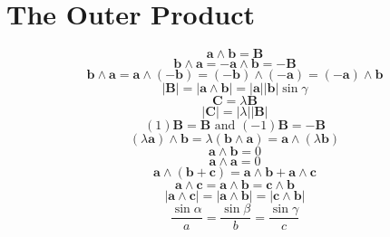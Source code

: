 \documentclass[11pt, a4paper, fleqn]{report}
\numberwithin{equation}{section}
\begin{document}
\section{The Outer Product}
\begin{equation}
    \mathbf{a}\wedge\mathbf{b}=\mathbf{B}
\end{equation}
\begin{equation}
    \mathbf{b}\wedge\mathbf{a}=-\mathbf{a}\wedge\mathbf{b}=-\mathbf{B}
\end{equation}
\begin{equation}
    \mathbf{b}\wedge\mathbf{a}=\mathbf{a}\wedge(-\mathbf{b})=(-\mathbf{b})\wedge(-\mathbf{a})=(-\mathbf{a})\wedge\mathbf{b}
\end{equation}
\begin{equation}
    |\mathbf{B}|=|\mathbf{a}\wedge\mathbf{b}|=|\mathbf{a}||\mathbf{b}|\sin\gamma
\end{equation}
\begin{equation}
    \mathbf{C}=\lambda\mathbf{B}
\end{equation}
\begin{equation}
    |\mathbf{C}|=|\lambda||\mathbf{B}|
\end{equation}
\begin{equation}
    (1)\mathbf{B}=\mathbf{B}\textrm{ and }(-1)\mathbf{B}=-\mathbf{B}
\end{equation}
\begin{equation}
    (\lambda\mathbf{a})\wedge\mathbf{b}=\lambda(\mathbf{b}\wedge\mathbf{a})=\mathbf{a}\wedge(\lambda\mathbf{b})
\end{equation}
\begin{equation}
    \mathbf{a}\wedge\mathbf{b}=0
\end{equation}
\begin{equation}
    \mathbf{a}\wedge\mathbf{a}=0
\end{equation}
\begin{equation}
    \mathbf{a}\wedge(\mathbf{b}+\mathbf{c})=\mathbf{a}\wedge\mathbf{b}+\mathbf{a}\wedge\mathbf{c}
\end{equation}
\begin{equation}
    \mathbf{a}\wedge\mathbf{c}=\mathbf{a}\wedge\mathbf{b}=\mathbf{c}\wedge\mathbf{b}
\end{equation}
\begin{equation}
    |\mathbf{a}\wedge\mathbf{c}|=|\mathbf{a}\wedge\mathbf{b}|=|\mathbf{c}\wedge\mathbf{b}|
\end{equation}
\begin{equation}
    \frac{\sin\alpha}{a} =\frac{\sin\beta}{b}=\frac{\sin\gamma}{c}
\end{equation}
\end{document}
